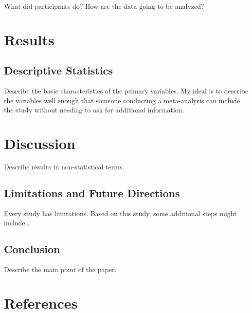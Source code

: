 \documentclass[
  jou,
  floatsintext,
  longtable,
  nolmodern,
  notxfonts,
  notimes,
  colorlinks=true,linkcolor=blue,citecolor=blue,urlcolor=blue]{apa7}
\begin{document}
What did participants do? How are the data going to be analyzed?

\section{Results}\label{results}

\subsection{Descriptive Statistics}\label{descriptive-statistics}

Describe the basic characteristics of the primary variables. My ideal is
to describe the variables well enough that someone conducting a
meta-analysis can include the study without needing to ask for
additional information.

\section{Discussion}\label{discussion}

Describe results in non-statistical terms.

\subsection{Limitations and Future
Directions}\label{limitations-and-future-directions}

Every study has limitations. Based on this study, some additional steps
might include\ldots{}

\subsection{Conclusion}\label{conclusion}

Describe the main point of the paper.

\section{References}\label{references}
\end{document}
